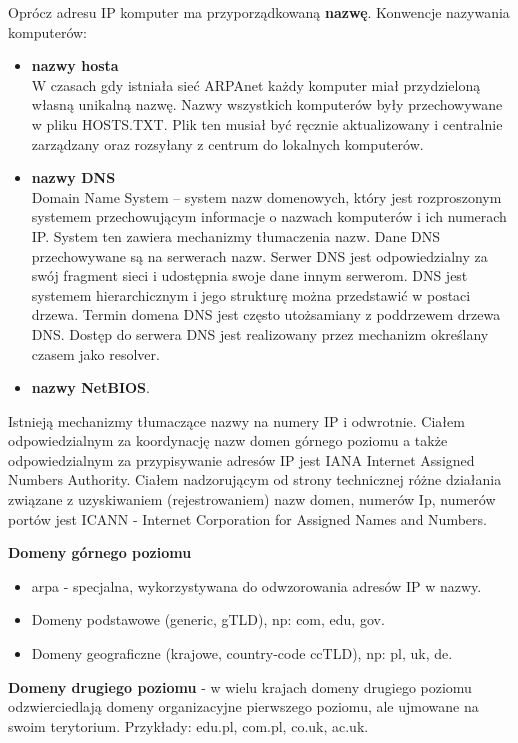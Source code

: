 \documentclass[a4paper]{article}
\begin{document}
Oprócz adresu IP komputer ma
przyporządkowaną \textbf{nazwę}. Konwencje nazywania komputerów:
\begin{itemize}
    \item \textbf{nazwy hosta}\\
    W czasach gdy istniała sieć ARPAnet każdy komputer miał przydzieloną własną
unikalną nazwę. Nazwy wszystkich komputerów były przechowywane w pliku HOSTS.TXT.
Plik ten musiał być ręcznie aktualizowany i centralnie zarządzany oraz rozsyłany z centrum
do lokalnych komputerów.
    \item \textbf{nazwy DNS}\\
    Domain Name System – system nazw domenowych, który jest rozproszonym systemem
przechowującym informacje o nazwach komputerów i ich numerach IP. System ten zawiera
mechanizmy tłumaczenia nazw. Dane DNS przechowywane są na serwerach nazw. Serwer DNS jest
odpowiedzialny za swój fragment sieci i udostępnia swoje dane innym serwerom. DNS jest systemem hierarchicznym i jego strukturę można przedstawić w
postaci drzewa. Termin domena DNS jest często utożsamiany z poddrzewem drzewa DNS. Dostęp do serwera DNS jest realizowany przez mechanizm określany czasem jako resolver.

    \item \textbf{nazwy NetBIOS}.

\end{itemize} 

Istnieją mechanizmy tłumaczące nazwy na numery IP i odwrotnie.
Ciałem odpowiedzialnym za koordynację nazw domen górnego poziomu a także
odpowiedzialnym za przypisywanie adresów IP jest IANA Internet Assigned Numbers
Authority.
Ciałem nadzorującym od strony technicznej różne działania związane z uzyskiwaniem
(rejestrowaniem) nazw domen, numerów Ip, numerów portów jest ICANN - Internet
Corporation for Assigned Names and Numbers.

\textbf{Domeny górnego poziomu}
\begin{itemize}
    \item arpa - specjalna, wykorzystywana do odwzorowania adresów IP w nazwy.
    \item Domeny podstawowe (generic, gTLD), np: com, edu, gov.
    \item Domeny geograficzne (krajowe, country-code ccTLD), np: pl, uk, de.
\end{itemize}

\textbf{Domeny drugiego poziomu} - w wielu krajach domeny drugiego poziomu odzwierciedlają
domeny organizacyjne pierwszego poziomu, ale ujmowane na swoim terytorium. Przykłady:
edu.pl, com.pl, co.uk, ac.uk.
\end{document}
